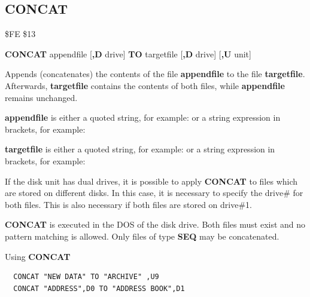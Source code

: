 \newpage
\subsection{CONCAT}
\begin{description}[leftmargin=2cm,style=nextline]
\item [Token:] \$FE \$13
\item [Format:] {\bf CONCAT} appendfile [{\bf,D} drive] {\bf TO}
                targetfile [{\bf,D} drive] [{\bf,U} unit]
\item [Usage:]
   Appends (concatenates) the contents of the file
   {\bf appendfile} to the file {\bf targetfile}. Afterwards, {\bf targetfile}
   contains the contents of both files, while {\bf appendfile}
   remains unchanged.

   {\bf appendfile} is either a quoted string, for example:  or
   a string expression in brackets, for example: 

   {\bf targetfile} is either a quoted string, for example:  or
   a string expression in brackets, for example: 

   If the disk unit has dual drives, it is possible to apply
   {\bf CONCAT} to files which are stored on different
   disks. In this case, it is necessary to specify the drive\#
   for both files. This is also necessary if both
   files are stored on drive\#1.

   \drivedefinition

   \unitdefinition

\item [Remarks:]
   {\bf CONCAT} is executed in the DOS of the disk drive.
   Both files must exist and no pattern matching is allowed.
   Only files of type {\bf SEQ} may be concatenated.

\item [Examples:] Using {\bf CONCAT}
\begin{tcolorbox}[colback=black,coltext=white]
\verbatimfont{\codefont}
\begin{verbatim}
  CONCAT "NEW DATA" TO "ARCHIVE" ,U9
  CONCAT "ADDRESS",D0 TO "ADDRESS BOOK",D1
\end{verbatim}
\end{tcolorbox}
\end{description}


\newpage
